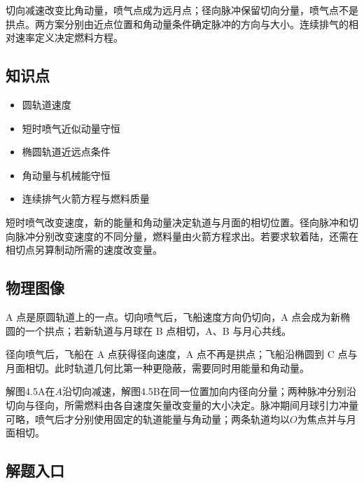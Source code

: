 \documentclass[UTF8,fontset=fandol,a4paper,11pt]{ctexart}
\providecommand{\tightlist}{\setlength{\itemsep}{0pt}\setlength{\parskip}{0pt}}
\begin{document}
切向减速改变比角动量，喷气点成为远月点；径向脉冲保留切向分量，喷气点不是拱点。两方案分别由近点位置和角动量条件确定脉冲的方向与大小。连续排气的相对速率定义决定燃料方程。



\subsection*{知识点}

\begin{itemize}
\tightlist
\item
  圆轨道速度
\item
  短时喷气近似动量守恒
\item
  椭圆轨道近远点条件
\item
  角动量与机械能守恒
\item
  连续排气火箭方程与燃料质量
\end{itemize}

短时喷气改变速度，新的能量和角动量决定轨道与月面的相切位置。径向脉冲和切向脉冲分别改变速度的不同分量，燃料量由火箭方程求出。若要求软着陆，还需在相切点另算制动所需的速度改变量。




\subsection*{物理图像}

A 点是原圆轨道上的一点。切向喷气后，飞船速度方向仍切向，A
点会成为新椭圆的一个拱点；若新轨道与月球在 B 点相切，A、B 与月心共线。

径向喷气后，飞船在 A 点获得径向速度，A 点不再是拱点；飞船沿椭圆到 C
点与月面相切。此时轨道几何比第一种更隐蔽，需要同时用能量和角动量。

解图4.5A在$A$沿切向减速，解图4.5B在同一位置加向内径向分量；两种脉冲分别沿切向与径向，所需燃料由各自速度矢量改变量的大小决定。脉冲期间月球引力冲量可略，喷气后才分别使用固定的轨道能量与角动量；两条轨道均以$O$为焦点并与月面相切。



\subsection*{解题入口}
\end{document}
